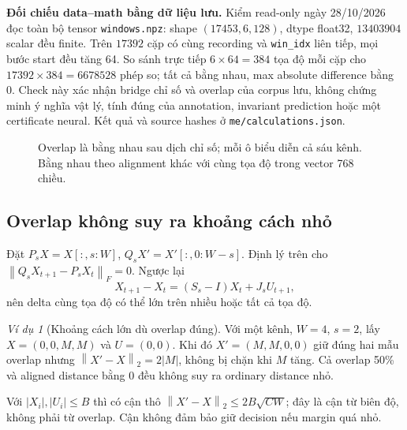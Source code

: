 \documentclass[11pt,a4paper]{article}
\newcommand{\norm}[1]{\left\lVert #1\right\rVert}
\newcommand{\code}[1]{{\small\ttfamily\nolinkurl{#1}}}
\theoremstyle{remark}
\newtheorem{example}[definition]{Ví dụ}
\begin{document}
\textbf{Đối chiếu data--math bằng dữ liệu lưu.} Kiểm read-only ngày
28/10/2026 đọc toàn bộ tensor \code{windows.npz}: shape
$(17453,6,128)$, dtype float32, $13403904$ scalar đều finite.
Trên $17392$ cặp có cùng recording và \code{win_idx} liên tiếp, mọi bước
start đều tăng 64. So sánh trực tiếp $6\times64=384$ tọa độ mỗi cặp cho
$17392\times384=6678528$ phép so; tất cả bằng nhau, max absolute difference
bằng 0. Check này xác nhận bridge chỉ số và overlap của corpus lưu, không
chứng minh ý nghĩa vật lý, tính đúng của annotation, invariant prediction
hoặc một certificate neural. Kết quả và source hashes ở
\code{me/calculations.json}.

\begin{figure}[htbp]\centering
{}
\caption{Overlap là bằng nhau sau dịch chỉ số; mỗi ô biểu diễn cả sáu
kênh. Bằng nhau theo alignment khác với cùng tọa độ trong vector 768 chiều.}
\end{figure}

\subsection{Overlap không suy ra khoảng cách nhỏ}
Đặt $P_sX=X[:,s:W]$, $Q_sX'=X'[:,0:W-s]$. Định lý trên cho
$\norm{Q_sX_{t+1}-P_sX_t}_F=0$. Ngược lại
\begin{equation}
 X_{t+1}-X_t=(S_s-I)X_t+J_sU_{t+1},
 \label{eq:delta}
\end{equation}
nên delta cùng tọa độ có thể lớn trên nhiều hoặc tất cả tọa độ.

\begin{example}[Khoảng cách lớn dù overlap đúng]
Với một kênh, $W=4$, $s=2$, lấy $X=(0,0,M,M)$ và
$U=(0,0)$. Khi đó $X'=(M,M,0,0)$ giữ đúng hai mẫu overlap nhưng
$\norm{X'-X}_2=2|M|$, không bị chặn khi $M$ tăng. Cả overlap 50\% và
aligned distance bằng 0 đều không suy ra ordinary distance nhỏ.
\end{example}
Với $|X_i|,|U_i|\le B$ thì có cận thô
$\norm{X'-X}_2\le2B\sqrt{CW}$; đây là cận từ biên độ, không phải từ
overlap. Cận không đảm bảo giữ decision nếu margin quá nhỏ.
\end{document}
